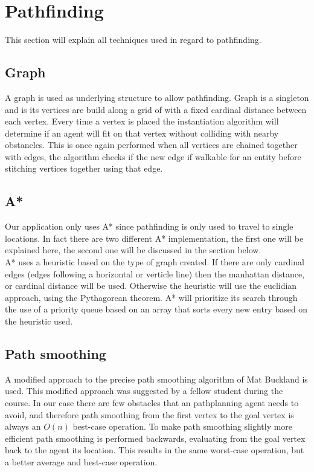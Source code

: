\documentclass{article}
\begin{document}
   \section {Pathfinding}
This section will explain all techniques used in regard to pathfinding.
   \subsection {Graph}
  A graph is used as underlying structure to allow pathfinding. Graph is a singleton and is its vertices are build along a grid of with a fixed cardinal distance between each vertex. Every time a vertex is placed the instantiation algorithm will determine if an agent will fit on that vertex without colliding with nearby obstancles. This is once again performed when all vertices are chained together with edges, the algorithm checks if the new edge if walkable for an entity before stitching vertices together using that edge.
   \subsection {A*}
  Our application only uses A* since pathfinding is only used to travel to single locations. In fact there are two different A* implementation, the first one will be explained here, the second one will be discussed in the section below. \\
  A* uses a heuristic based on the type of graph created. If there are only cardinal edges (edges following a horizontal or verticle line) then the manhattan distance, or cardinal distance will be used. Otherwise the heuristic will use the euclidian approach, using the Pythagorean theorem. A* will prioritize its search through the use of a priority queue based on an array that sorts every new entry based on the heuristic used. 
   \subsection {Path smoothing}
A modified approach to the precise path smoothing algorithm of Mat Buckland \cite{pgaie} is used. This modified approach was suggested by a fellow student during the course. In our case there are few obstacles that an pathplanning agent needs to avoid, and therefore path smoothing from the first vertex to the goal vertex is always an \(O(n)\) best-case operation. To make path smoothing slightly more efficient path smoothing is performed backwards, evaluating from the goal vertex back to the agent its location. This results in the same worst-case operation, but a better average and best-case operation.
\end{document}
